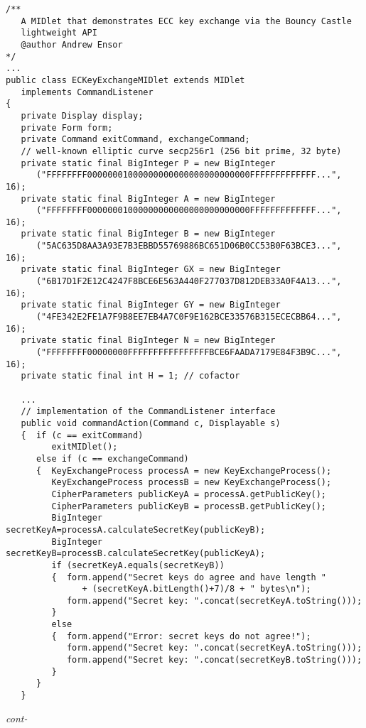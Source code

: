 \begin{figure*}\begin{program}\begin{verbatim}
/**
   A MIDlet that demonstrates ECC key exchange via the Bouncy Castle
   lightweight API
   @author Andrew Ensor
*/
...
public class ECKeyExchangeMIDlet extends MIDlet
   implements CommandListener
{
   private Display display;
   private Form form;
   private Command exitCommand, exchangeCommand;
   // well-known elliptic curve secp256r1 (256 bit prime, 32 byte)
   private static final BigInteger P = new BigInteger
      ("FFFFFFFF00000001000000000000000000000000FFFFFFFFFFFFF...", 16);
   private static final BigInteger A = new BigInteger
      ("FFFFFFFF00000001000000000000000000000000FFFFFFFFFFFFF...", 16);
   private static final BigInteger B = new BigInteger
      ("5AC635D8AA3A93E7B3EBBD55769886BC651D06B0CC53B0F63BCE3...", 16);
   private static final BigInteger GX = new BigInteger
      ("6B17D1F2E12C4247F8BCE6E563A440F277037D812DEB33A0F4A13...", 16);
   private static final BigInteger GY = new BigInteger
      ("4FE342E2FE1A7F9B8EE7EB4A7C0F9E162BCE33576B315ECECBB64...", 16);
   private static final BigInteger N = new BigInteger
      ("FFFFFFFF00000000FFFFFFFFFFFFFFFFBCE6FAADA7179E84F3B9C...", 16);
   private static final int H = 1; // cofactor

   ...
   // implementation of the CommandListener interface
   public void commandAction(Command c, Displayable s)
   {  if (c == exitCommand)
         exitMIDlet();
      else if (c == exchangeCommand)
      {  KeyExchangeProcess processA = new KeyExchangeProcess();
         KeyExchangeProcess processB = new KeyExchangeProcess();
         CipherParameters publicKeyA = processA.getPublicKey();
         CipherParameters publicKeyB = processB.getPublicKey();
         BigInteger secretKeyA=processA.calculateSecretKey(publicKeyB);
         BigInteger secretKeyB=processB.calculateSecretKey(publicKeyA);
         if (secretKeyA.equals(secretKeyB))
         {  form.append("Secret keys do agree and have length "
               + (secretKeyA.bitLength()+7)/8 + " bytes\n");
            form.append("Secret key: ".concat(secretKeyA.toString()));
         }
         else
         {  form.append("Error: secret keys do not agree!");
            form.append("Secret key: ".concat(secretKeyA.toString()));
            form.append("Secret key: ".concat(secretKeyB.toString()));
         }
      }
   }
\end{verbatim}\hfill \emph{cont-}\end{program}\end{figure*}%
